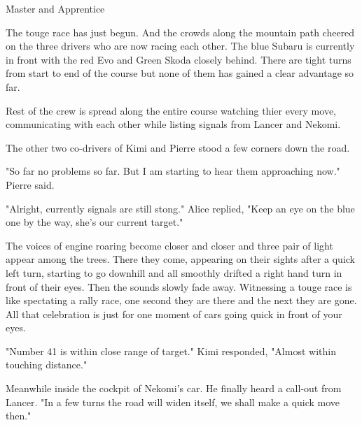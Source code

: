 \h{Master and Apprentice}

The touge race has just begun. And the crowds along the mountain path cheered on the three drivers who are now racing each other. The blue Subaru is currently in front with the red Evo and Green Skoda closely behind. There are tight turns from start to end of the course but none of them has gained a clear advantage so far.

Rest of the crew is spread along the entire course watching thier every move, communicating with each other while listing signals from Lancer and Nekomi.

The other two co-drivers of Kimi and Pierre stood a few corners down the road.

"So far no problems so far. But I am starting to hear them approaching now." Pierre said.

"Alright, currently signals are still stong." Alice replied, "Keep an eye on the blue one by the way, she's our current target."

The voices of engine roaring become closer and closer and three pair of light appear among the trees. There they come, appearing on their sights after a quick left turn, starting to go downhill and all smoothly drifted a right hand turn in front of their eyes. Then the sounds slowly fade away. Witnessing a touge race is like spectating a rally race, one second they are there and the next they are gone. All that celebration is just for one moment of cars going quick in front of your eyes.

"Number 41 is within close range of target." Kimi responded, "Almost within touching distance."

Meanwhile inside the cockpit of Nekomi's car. He finally heard a call-out from Lancer. "In a few turns the road will widen itself, we shall make a quick move then."